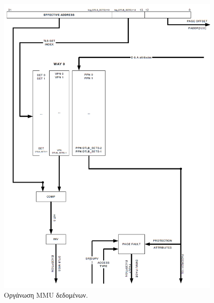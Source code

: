 \documentclass[a4paper,10pt]{article}
\numberwithin{figure}{section}
\numberwithin{table}{section}
\begin{document}
\newpage
\vspace{0.7cm}
\begin{figure}[h!]
 \centering
 \includegraphics[bb=0 0 891 1229,scale=0.38]{./Images/data_MMU.png}
 \caption{Οργάνωση MMU δεδομένων.}
\end{figure}
\vspace{0.7cm}
\end{document}
